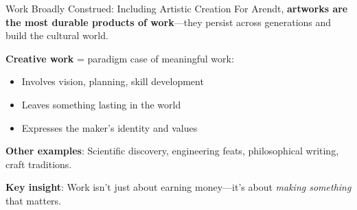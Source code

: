 ﻿\documentclass[aspectratio=169,11pt]{beamer}
\begin{document}
\begin{frame}{Work Broadly Construed: Including Artistic Creation}
For Arendt, \textbf{artworks are the most durable products of work}---they persist across generations and build the cultural world.

\vspace{0.3em}
\textbf{Creative work} = paradigm case of meaningful work:
\begin{itemize}
    \item Involves vision, planning, skill development
    \item Leaves something lasting in the world
    \item Expresses the maker's identity and values
\end{itemize}

\vspace{0.3em}
\textbf{Other examples}: Scientific discovery, engineering feats, philosophical writing, craft traditions.

\vspace{0.3em}
\textbf{Key insight}: Work isn't just about earning money---it's about \emph{making something} that matters.
\end{frame}
\end{document}
